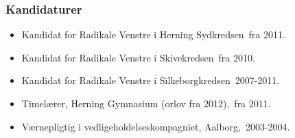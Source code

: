 \documentclass[11pt, a4paper]{awesome-cv}
\begin{document}
\begin{cvletter}
\subsubsection*{Kandidaturer}
\begin{itemize}
\item Kandidat for Radikale Venstre i Herning Sydkredsen fra 2011.
\item Kandidat for Radikale Venstre i Skivekredsen fra 2010.
\item Kandidat for Radikale Venstre i Silkeborgkredsen 2007-2011.
\end{itemize}
\begin{itemize}
\item Timelærer, Herning Gymnasium (orlov fra 2012), fra 2011.
\item Værnepligtig i vedligeholdelseskompagniet, Aalborg, 2003-2004.
\end{itemize}
\end{cvletter}
\end{document}
